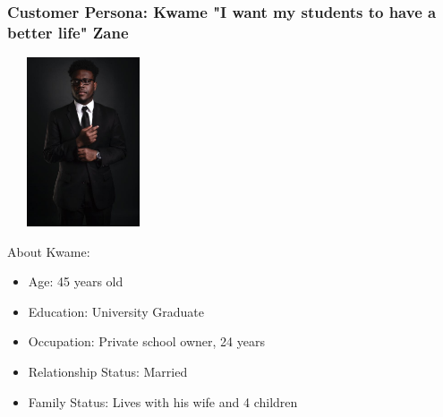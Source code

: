\documentclass[letterpaper]{article}
\begin{document}
        \subsubsection{Customer Persona: Kwame "I want my students to have a better life" Zane}
            \begin{multicols}{2}
                \includegraphics[width=4.5cm, height=5cm]{man} \\
                \begin{large}
                    About Kwame:
                \end{large}
                \begin{itemize}
                    \item Age: 45 years old
                    \item Education: University Graduate
                    \item Occupation: Private school owner, 24 years
                    \item Relationship Status: Married
                    \item Family Status: Lives with his wife and 4 children
                \end{itemize}
            \end{multicols}
\end{document}
